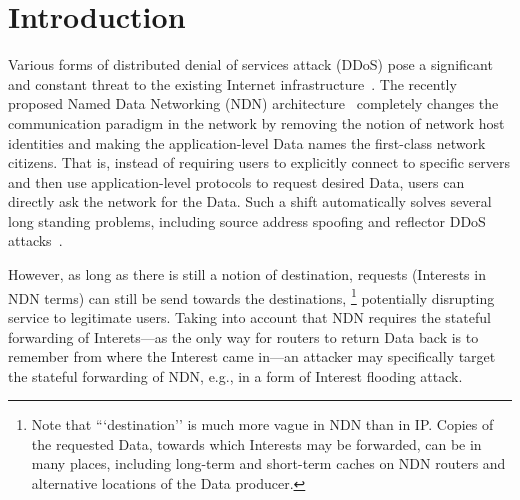 \section{Introduction}
\label{sec:intro}





Various forms of distributed denial of services attack (DDoS) pose a significant and constant threat to the existing Internet infrastructure~\cite{arbor-report}.
The recently proposed Named Data Networking (NDN) architecture~\cite{ndn-conext, ndn-tr} completely changes the communication paradigm in the network by removing the notion of network host identities and making the application-level Data names the first-class network citizens.
That is, instead of requiring users to explicitly connect to specific servers and then use application-level protocols to request desired Data, users can directly ask the network for the Data.
Such a shift automatically solves several long standing problems, including source address spoofing and reflector DDoS attacks~\cite{mirkovic2004taxonomy}.

However, as long as there is still a notion of destination, requests (Interests in NDN terms) can still be send towards the destinations,%
\footnote{Note that ```destination'' is much more vague in NDN than in IP. 
Copies of the requested Data, towards which Interests may be forwarded, can be in many places, including long-term and short-term caches on NDN routers and alternative locations of the Data producer.} 
potentially disrupting service to legitimate users.
Taking into account that NDN requires the stateful forwarding of Interets---as the only way for routers to return Data back is to remember from where the Interest came in---an attacker may specifically target the stateful forwarding of NDN, e.g., in a form of Interest flooding attack. 

